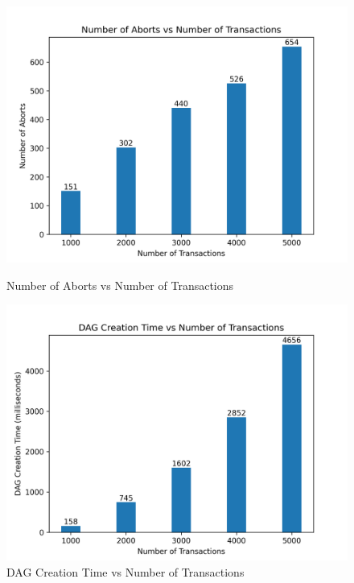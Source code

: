 \documentclass[12pt]{article}
\begin{document}
\begin{figure}[h]
    \centering
    \begin{minipage}
        {0.49\textwidth}
        \includegraphics[width=\textwidth]{images/numTrans_vs_Aborts.png}
        \caption{Number of Aborts vs Number of Transactions}
        \label{fig:numTrans_vs_Aborts}
    \end{minipage}
    \hfill
    \begin{minipage}
        {0.49\textwidth}
        \includegraphics[width=\textwidth]{images/numTrans_vs_DAGCreationTime.png}
        \caption{DAG Creation Time vs Number of Transactions}
        \label{fig:numTrans_vs_DAGCreationTime}
    \end{minipage}
\end{figure}
    
\end{document}
